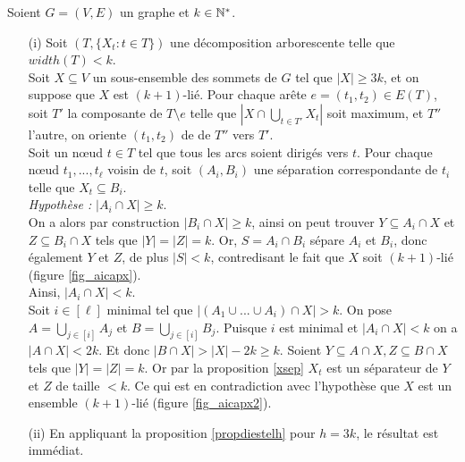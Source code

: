 	Soient $G = (V,E)$ un graphe et $k \in \mathbb{N}^*$.
	\begin{itemize}
		\item[(i)] 
		Soit $(T,\{X_t : t \in T\})$ une décomposition arborescente telle que $width(T) < k$.
		\\
		Soit $X \subseteq V$ un sous-ensemble des sommets de $G$ tel que $|X| \geq 3k$,
		et on suppose que $X$ est $(k+1)$-lié.
		Pour chaque arête $e = (t_1,t_2) \in E(T)$, soit $T'$ la composante de $T \setminus e$ telle que
		$|X \cap \bigcup\limits_{t\in T'}X_t|$ soit maximum, et $T''$ l'autre, on oriente $(t_1,t_2)$ de 
		de $T''$ vers $T'$.
		\\
		Soit un n\oe ud $t \in T$ tel que tous les arcs soient dirigés vers $t$.
		Pour chaque n\oe ud $t_1,...,t_\ell$ voisin de $t$, soit $(A_i,B_i)$ une
		séparation correspondante de $t_i$ telle que $X_t \subseteq B_i$.\\
		{\em Hypothèse :} $|A_i \cap X| \geq k$.\\
		On a alors par construction $|B_i \cap X| \geq k$, ainsi on peut trouver
		$Y \subseteq A_i \cap X$ et $Z \subseteq B_i \cap X$ tels que $|Y| = |Z| = k$.
		Or, $S = A_i \cap B_i$ sépare $A_i$ et $B_i$, donc également $Y$ et $Z$, de
		plus $|S| < k$, contredisant le fait que $X$ soit $(k+1)$-lié (figure \ref{fig_aicapx}).
		\\
		
		Ainsi, $|A_i \cap X| < k$.
		\\
		Soit $i \in [\ell]$ minimal tel que $|(A_1 \cup ... \cup A_i) \cap X| > k$.
		On pose $A = \bigcup\limits_{j \in [i]} A_j$ et 
		$B = \bigcup\limits_{j\in [i]} B_j$.
		Puisque $i$ est minimal et $|A_i \cap X| < k$ on a $|A \cap X| < 2k$.
		Et donc $|B\cap X| > |X| - 2k \geq k$.
		Soient $Y \subseteq A \cap X, Z \subseteq B\cap X$ tels que
		$|Y| = |Z| = k$.
		Or par la proposition \ref{xsep} $X_t$ est un séparateur de $Y$ et $Z$
		de taille $ < k$.
		Ce qui est en contradiction avec l'hypothèse que $X$ est un ensemble
		$(k+1)$-lié (figure \ref{fig_aicapx2}).
		\\
		
		
		\item[(ii)]
		En appliquant la proposition \ref{propdiestelh} pour $h = 3k$, le résultat est immédiat.


	\end{itemize}

